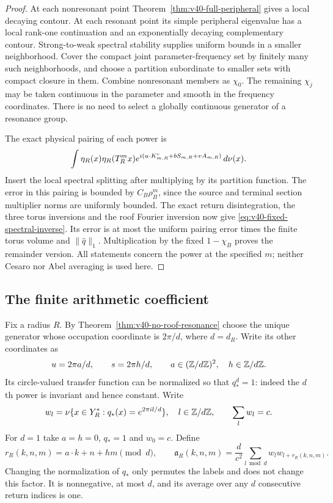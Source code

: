 \begin{proof}
At each nonresonant point Theorem~\ref{thm:v40-full-peripheral} gives
a local decaying contour. At each resonant point its simple
peripheral eigenvalue has a local rank-one continuation and an
exponentially decaying complementary contour. Strong-to-weak spectral
stability supplies uniform bounds in a smaller neighborhood. Cover
the compact joint parameter-frequency set by finitely many such
neighborhoods, and choose a partition subordinate to smaller sets
with compact closure in them. Combine nonresonant members as
$\chi_0$. The remaining $\chi_j$ may be taken continuous in the
parameter and smooth in the frequency coordinates. There is no need
to select a globally continuous generator of a resonance group.

The exact physical pairing of each power is
\[
 \int\eta_R(x)\eta_R(T_R^m x)
        e^{i(u\cdot K_{m,R}^{\rm c}+bS_{m,R}+vA_{m,R})}\,d\nu(x).
\]
Insert the local spectral splitting after multiplying by its partition
function. The error in this pairing is bounded by $C_B\rho_B^m$,
since the source and terminal section multiplier norms are uniformly
bounded. The exact return disintegration, the three torus inversions
and the roof Fourier inversion now give
\eqref{eq:v40-fixed-spectral-inverse}. Its error is at most the
uniform pairing error times the finite torus volume and
$\|\widehat q\|_1$. Multiplication by the fixed $1-\chi_B$ proves
the remainder version. All statements concern the power at the
specified $m$; neither Cesaro nor Abel averaging is used here.
\end{proof}

\subsection{The finite arithmetic coefficient}
Fix a radius $R$. By Theorem~\ref{thm:v40-no-roof-resonance} choose
the unique generator whose occupation coordinate is $2\pi/d$, where
$d=d_R$. Write its other coordinates as
\[
 u=2\pi a/d,
 \qquad s=2\pi h/d,
 \qquad a\in(\mathbb Z/d\mathbb Z)^2,\quad h\in\mathbb Z/d\mathbb Z.
\]
Its circle-valued transfer function can be normalized so that $q_*^d=1$:
indeed the $d$th power is invariant and hence constant. Write
\begin{equation}\label{eq:v40-section-phase-masses}
 w_l=\nu\{x\in Y_R^*:q_*(x)=e^{2\pi il/d}\},
       \quad l\in\Z/d\Z,\qquad \sum_lw_l=c.
\end{equation}
For $d=1$ take $a=h=0$, $q_*=1$ and $w_0=c$.
Define
\begin{equation}\label{eq:v40-arithmetic-factor}
 r_R(k,n,m)=a\cdot k+n+hm\pmod d,
 \qquad
 \mathfrak a_R(k,n,m)=\frac d{c^2}\sum_{l\bmod d}w_lw_{l+r_R(k,n,m)}.
\end{equation}
Changing the normalization of $q_*$ only permutes the labels and does
not change this factor. It is nonnegative, at most $d$, and its
average over any $d$ consecutive return indices is one.

